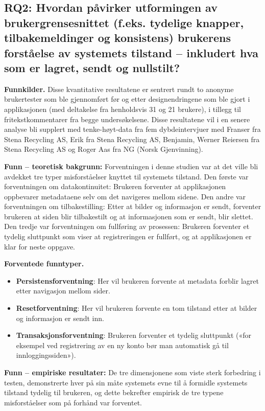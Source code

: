 \subsection{RQ2: Hvordan påvirker utformingen av brukergrensesnittet (f.eks. tydelige knapper, tilbakemeldinger og konsistens) brukerens forståelse av systemets tilstand – inkludert hva som er lagret, sendt og nullstilt?}

\textbf{Funnkilder.} Disse kvantitative resultatene er sentrert rundt to anonyme brukertester som ble gjennomført før og etter designendringene som ble gjort i applikasjonen (med deltakelse fra henholdsvis 31 og 21 brukere), i tillegg til fritekstkommentarer fra begge undersøkelsene. Disse resultatene vil i en senere analyse bli supplert med tenke-høyt-data fra fem dybdeintervjuer med Franser fra Stena Recycling AS, Erik fra Stena Recycling AS, Benjamin, Werner Reiersen fra Stena Recycling AS og Roger Aas fra NG (Norsk Gjenvinning).

\textbf{Funn – teoretisk bakgrunn: } Forventningen i denne studien var at det ville bli avdekket tre typer misforståelser knyttet til systemets tilstand. Den første var forventningen om datakontinuitet: Brukeren forventer at applikasjonen oppbevarer metadataene selv om det navigeres mellom sidene. Den andre var forventningen om tilbakestilling: Etter at bilder og informasjon er sendt, forventer brukeren at siden blir tilbakestilt og at informasjonen som er sendt, blir slettet. Den tredje var forventningen om fullføring av prosessen: Brukeren forventer et tydelig sluttpunkt som viser at registreringen er fullført, og at applikasjonen er klar for neste oppgave.


\textbf{Forventede funntyper.}
\begin{itemize}
  \item \textbf{Persistensforventning}:  Her vil brukeren forvente at metadata forblir lagret etter navigasjon mellom sider.

  \item \textbf{Resetforventning}: Her vil brukeren forvente en tom tilstand etter at bilder og informasjon er sendt inn.
  \item \textbf{Transaksjonsforventning}: Brukeren forventer et tydelig sluttpunkt («for eksempel ved registrering av en ny konto bør man automatisk gå til innloggingssiden»).
\end{itemize}

\textbf{Funn – empiriske resultater: } De tre dimensjonene som viste sterk forbedring i testen, demonstrerte hver på sin måte systemets evne til å formidle systemets tilstand tydelig til brukeren, og dette bekrefter empirisk de tre typene misforståelser som på forhånd var forventet.

